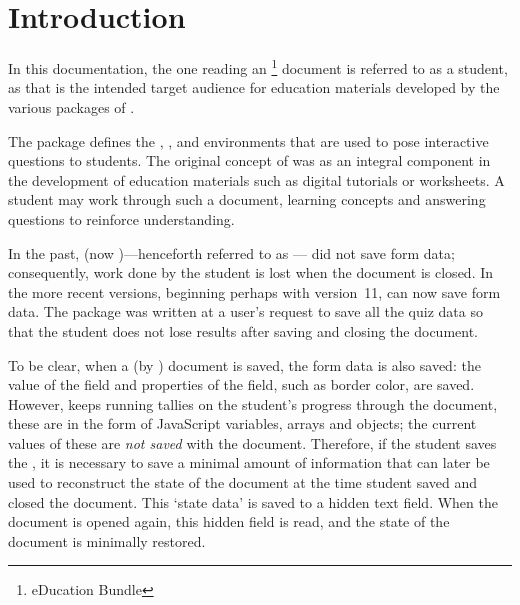 \documentclass{article}
\makeatletter
\def\hisher{\@ifstar{\hisheri}{\global\advance\hesheCnt1\relax\hisheri}}
\def\hisheri{\ifodd\hesheCnt her\else his\fi}
\makeatother
\begin{document}
\maketitle

\tableofcontents
{}


\section{Introduction}

In this documentation, the one reading an \AEB\footnote{{\AcroTeX} eDucation
Bundle} document is referred to as a student, as that is the intended target
audience for education materials developed by the various packages of \AEB.

The  package defines the , , and
 environments that are used to pose interactive questions to
students. The original concept of  was as an integral component
in the development of education materials such as digital tutorials or
worksheets. A student may work through such a document, learning concepts and
answering questions to reinforce {\hisher} understanding.

In the past,  (now )---henceforth
referred to as --- did not save form data; consequently, work done by
the student is lost when the document is closed. In the more recent versions,
beginning perhaps with version~11,  can now save form data. The
 package was written at a user's request to save all the quiz
data so that the student does not lose {\hisher} results after saving and
closing the document.

To be clear, when a {\PDF} (by ) document is saved, the form data is
also saved: the value of the field and properties of the field, such as
border color, are saved. However,  keeps running tallies on the
student's progress through the document, these are in the form of JavaScript
variables, arrays and objects; the current values of these are \emph{not
saved} with the document. Therefore, if the student saves the \PDF, it is
necessary to save a minimal amount of information that can later be used to
reconstruct the state of the document at the time student saved and closed the
document. This `state data' is saved to a hidden text field. When the
document is opened again, this hidden field is read, and the state of the
document is minimally restored.
\end{document}
